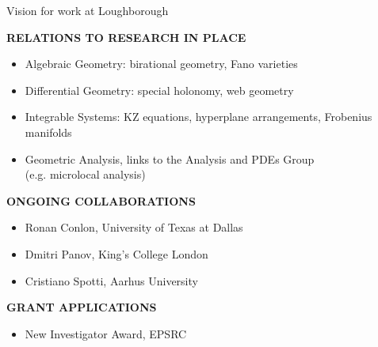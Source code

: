 \documentclass{beamer}
\begin{document}
\begin{frame}{Vision for work at Loughborough}
	\begin{center}
	\textbf{RELATIONS TO RESEARCH IN PLACE}
	\begin{itemize}
		\item Algebraic Geometry: birational geometry, Fano varieties
		\item Differential Geometry: special holonomy, web geometry
		\item Integrable Systems: KZ equations, hyperplane arrangements, Frobenius manifolds
		\item Geometric Analysis, links to the Analysis and PDEs Group \\ (e.g. microlocal analysis)
	\end{itemize}	
	\textbf{ONGOING COLLABORATIONS}
	\begin{itemize}
		\item Ronan Conlon, University of Texas at Dallas
		\item Dmitri Panov, King's College London
		\item Cristiano Spotti, Aarhus University
	\end{itemize}
	\textbf{GRANT APPLICATIONS}
	\begin{itemize}
		\item New Investigator Award, EPSRC
	\end{itemize}	
	\end{center}
\end{frame}

\begin{frame}
	\begin{center}
		\huge
		\textbf{
		{\color{blue!50!black}{THANK YOU!}}
		}
	\end{center}
\end{frame}
\end{document}
